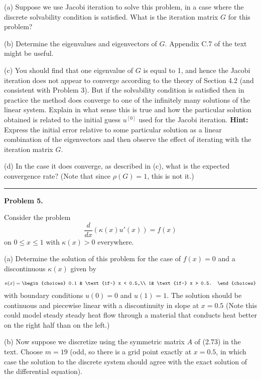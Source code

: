 \documentclass[10pt]{article}
\begin{document}
(a) Suppose we use Jacobi iteration to solve this problem, in a case where
the discrete solvability condition is satisfied.  What is the
iteration matrix $G$ for this problem? 

(b) Determine the eigenvalues and eigenvectors of $G$.
Appendix C.7 of the text might be useful.

(c) You should find that one eigenvalue of $G$ is equal to 1, and hence the
Jacobi iteration does not appear to converge according to the theory of
Section 4.2 (and consistent with Problem 3).  
But if the solvability condition is satisfied then in practice 
the method does converge to one of the infinitely many solutions of the
linear system.  Explain in what sense this is true and how the particular
solution obtained is related to the initial guess $u^{[0]}$ used for the
Jacobi iteration.
{\bf Hint:} Express the initial error relative to some particular solution
as a linear combination of the eigenvectors and then observe the effect of
iterating with the iteration matrix $G$.

(d) In the case it does converge, as described in (c), what is the
expected convergence rate?  (Note that since $\rho(G)=1$, this is not it.)






\vskip 1cm
\hrule
{\bf Problem 5.}

Consider the problem
\[
\frac{d}{dx}\left(\kappa(x) u'(x)\right) = f(x)
\]
on $0\leq x \leq 1$ with $\kappa(x) >0$ everywhere. 

(a) Determine the solution of this problem for the case of $f(x)=0$ and
a discontinuous $\kappa(x)$ given by

\[
\kappa(x) = \begin{choices}
0.1 & \text{if~}  x < 0.5,\\
1& \text{if~}  x > 0.5.
\end{choices}
\]
with boundary conditions $u(0) = 0$ and $u(1) = 1$. The solution should be
continuous and piecewise linear with a discontinuity in slope at $x=0.5$
(Note this could model steady steady heat flow through a material that
conducts heat better on the right half than on the left.)


(b) Now suppose we discretize using the symmetric matrix $A$ of
(2.73) in the text.  Choose $m=19$ (odd, so there is a grid point exactly
at $x=0.5$, in which case the solution to the discrete system should
agree with the exact solution of the differential equation).
\end{document}
